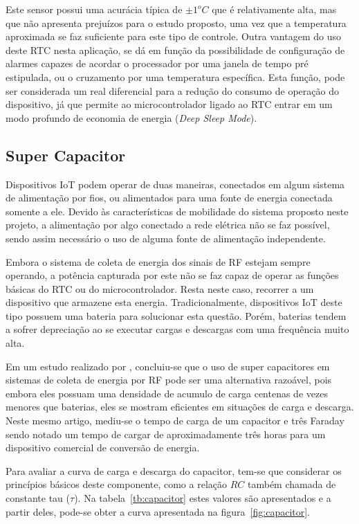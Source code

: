 Este sensor possui uma acurácia típica de $\pm 1^oC$ que é relativamente alta, mas que não apresenta prejuízos para o estudo proposto, uma vez que a temperatura aproximada se faz suficiente para este tipo de controle.
Outra vantagem do uso deste RTC nesta aplicação, se dá em função da possibilidade de configuração de alarmes capazes de acordar o processador por uma janela de tempo pré estipulada, ou o cruzamento por uma temperatura específica. Esta função, pode ser considerada um real diferencial para a redução do consumo de operação do dispositivo, já que permite ao microcontrolador ligado ao RTC entrar em um modo profundo de economia de energia (\textit{Deep Sleep Mode}).

\subsection{Super Capacitor}
Dispositivos IoT podem operar de duas maneiras, conectados em algum sistema de alimentação por fios, ou alimentados para uma fonte de energia conectada somente a ele. Devido às características de mobilidade do sistema proposto neste projeto, a alimentação por algo conectado a rede elétrica não se faz possível, sendo assim necessário o uso de alguma fonte de alimentação independente.

Embora o sistema de coleta de energia dos sinais de RF estejam sempre operando, a potência capturada por este não se faz capaz de operar as funções básicas do RTC ou do microcontrolador.
Resta neste caso, recorrer a um dispositivo que armazene esta energia. Tradicionalmente, dispositivos IoT deste tipo possuem uma bateria para solucionar esta questão. Porém, baterias tendem a sofrer depreciação ao se executar cargas e descargas com uma frequência muito alta. 

Em um estudo realizado por , concluiu-se que o uso de super capacitores em sistemas de coleta de energia por RF pode ser uma alternativa razoável, pois embora eles possuam uma densidade de acumulo de carga centenas de vezes menores que baterias, eles se mostram eficientes em situações de carga e descarga. Neste mesmo artigo, mediu-se o tempo de carga de um capacitor e três Faraday sendo notado um tempo de cargar de aproximadamente três horas para um dispositivo comercial de conversão de energia.

Para avaliar a curva de carga e descarga do capacitor, tem-se que considerar os princípios básicos deste componente, como a relação $RC$ também chamada de constante tau ($\tau$). Na tabela~\ref{tb:capacitor} estes valores são apresentados e a partir deles, pode-se obter a curva apresentada na figura~\ref{fig:capacitor}.

